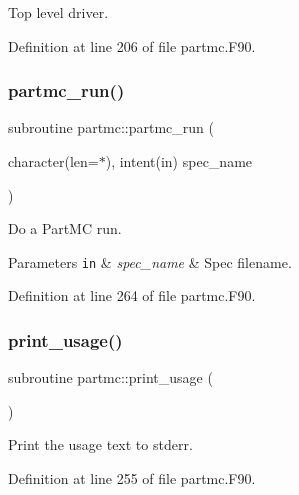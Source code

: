 Top level driver. 



Definition at line 206 of file partmc.\+F90.

\mbox{\label{partmc_8_f90_a32ba5f48cd2e63a9f283a9906b45cf89}} 
\subsubsection{\texorpdfstring{partmc\+\_\+run()}{partmc\_run()}}
{\footnotesize\ttfamily subroutine partmc\+::partmc\+\_\+run (\begin{DoxyParamCaption}\item[{character(len=$\ast$), intent(in)}]{spec\+\_\+name }\end{DoxyParamCaption})}



Do a Part\+MC run. 


\begin{DoxyParams}[1]{Parameters}
\mbox{\tt in}  & {\em spec\+\_\+name} & Spec filename. \\
\hline
\end{DoxyParams}


Definition at line 264 of file partmc.\+F90.

\mbox{\label{partmc_8_f90_a96d0718eb3ffe924b0ed6bf52f51f366}} 
\subsubsection{\texorpdfstring{print\+\_\+usage()}{print\_usage()}}
{\footnotesize\ttfamily subroutine partmc\+::print\+\_\+usage (\begin{DoxyParamCaption}{ }\end{DoxyParamCaption})}



Print the usage text to stderr. 



Definition at line 255 of file partmc.\+F90.

